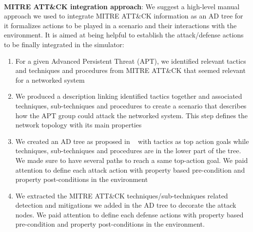 \

\noindent
\textbf{MITRE ATT\&CK integration approach}: We suggest a high-level manual approach we used to integrate MITRE ATT\&CK information as an AD tree for it formalizes actions to be played in a scenario and their interactions with the environment. It is aimed at being helpful to establish the attack/defense actions to be finally integrated in the simulator:
\begin{enumerate}[label=\arabic*),itemjoin={;\quad}]

    \item For a given Advanced Persistent Threat (APT), we identified relevant tactics and techniques and procedures from MITRE ATT\&CK that seemed relevant for a networked system
    
    \item We produced a description linking identified tactics together and associated techniques, sub-techniques and procedures to create a scenario that describes how the APT group could attack the networked system. This step defines the network topology with its main properties

    \item We created an AD tree as proposed in ~\cite{BKordy2010} with tactics as top action goals while techniques, sub-techniques and procedures are in the lower part of the tree. We made sure to have several paths to reach a same top-action goal. We paid attention to define each attack action with property based pre-condition and property post-conditions in the environment

    \item We extracted the MITRE ATT\&CK techniques/sub-techniques related detection and mitigations we added in the AD tree to decorate the attack nodes. We paid attention to define each defense actions with property based pre-condition and property post-conditions in the environment.




\end{enumerate}
